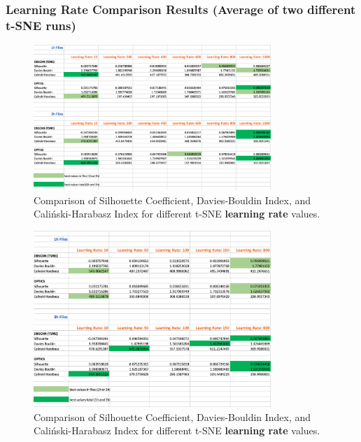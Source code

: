 \subsubsection{Learning Rate Comparison Results (Average of two different t-SNE runs)}
\label{appendix:compareAverageLearningRate}


\begin{figure}[H]
  \centering
  \includegraphics[width=0.8\textwidth]{./images/tsneParametersTest/learningRate/learningRateEvaluationScoresAverage.png}
  \caption{Comparison of Silhouette Coefficient, Davies-Bouldin Index, and Caliński-Harabasz Index for different t-SNE \textbf{learning rate} values.}
  \label{figure:learningRateEvaluationScoresAverage}
\end{figure}

\begin{figure}[H]
  \centering
  \includegraphics[width=0.8\textwidth]{./images/tsneParametersTest/learningRate/learningRateEvaluationScoresAverageDetailed.png}
  \caption{Comparison of Silhouette Coefficient, Davies-Bouldin Index, and Caliński-Harabasz Index for different t-SNE \textbf{learning rate} values.}
  \label{figure:learningRateEvaluationScoresAverageDetailed}
\end{figure}

